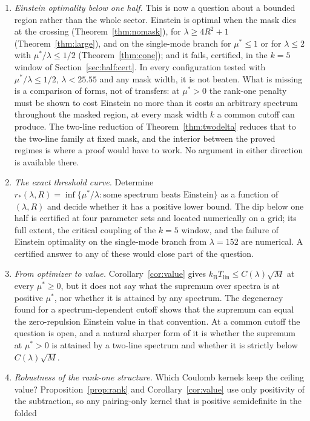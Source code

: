 \documentclass[11pt]{article}
\newcommand{\kb}{k_{\mathrm B}}
\newcommand{\Tlin}{T_{\mathrm{lin}}}
\newcommand{\muS}{\mu^{*}}
\theoremstyle{definition}
\theoremstyle{remark}
\begin{document}
\begin{enumerate}[label=(\arabic*),leftmargin=2.2em]
\item \emph{Einstein optimality below one half.} This is now a question about a bounded
region rather than the whole sector. Einstein is optimal when the mask dies at the
crossing (Theorem~\ref{thm:nomask}), for $\lambda\ge4R^2+1$
(Theorem~\ref{thm:large}), and on the single-mode branch for $\muS\le1$ or for $\lambda\le2$
with $\muS/\lambda\le1/2$ (Theorem~\ref{thm:cone}); and it fails, certified, in the
$k=5$ window of Section~\ref{sec:half:cert}. In every configuration tested with
$\muS/\lambda\le1/2$,
$\lambda<25.55$ and any mask width, it is not beaten. What is missing is a comparison of
forms, not of transfers: at $\muS>0$ the rank-one penalty must be shown to cost Einstein no
more than it costs an arbitrary spectrum throughout the masked region, at every mask width
$k$ a common cutoff can produce. The two-line reduction of
Theorem~\ref{thm:twodelta} reduces that to the two-line family at fixed mask, and the
interior between the proved regimes is where a proof would have to work. No argument in
either direction is available there.
\item \emph{The exact threshold curve.} Determine
$r_*(\lambda,R)=\inf\{\muS/\lambda:\text{some spectrum beats Einstein}\}$ as a function of
$(\lambda,R)$ and decide whether it has a positive lower bound. The dip below one half is
certified at four parameter sets and located numerically on a grid; its full extent, the
critical coupling of the $k=5$ window, and the failure of Einstein optimality on the
single-mode branch from $\lambda=152$ are numerical. A certified answer to any of these
would close part of the question.
\item \emph{From optimizer to value.} Corollary~\ref{cor:value} gives
$\kb\Tlin\le C(\lambda)\sqrt M$ at every $\muS\ge0$, but it does not say what the supremum
over spectra is at positive $\muS$, nor whether it is attained by any spectrum. The
degeneracy found for a spectrum-dependent cutoff shows that the supremum can equal the
zero-repulsion Einstein value in that convention. At a common cutoff the question is open,
and a natural sharper form of it is whether the supremum at $\muS>0$ is attained by a
two-line spectrum and whether it is strictly below $C(\lambda)\sqrt M$.
\item \emph{Robustness of the rank-one structure.} Which Coulomb kernels keep the ceiling
value? Proposition~\ref{prop:rank} and Corollary~\ref{cor:value} use only positivity of the
subtraction, so any pairing-only kernel that is positive semidefinite in the folded

\end{enumerate}
\end{document}
